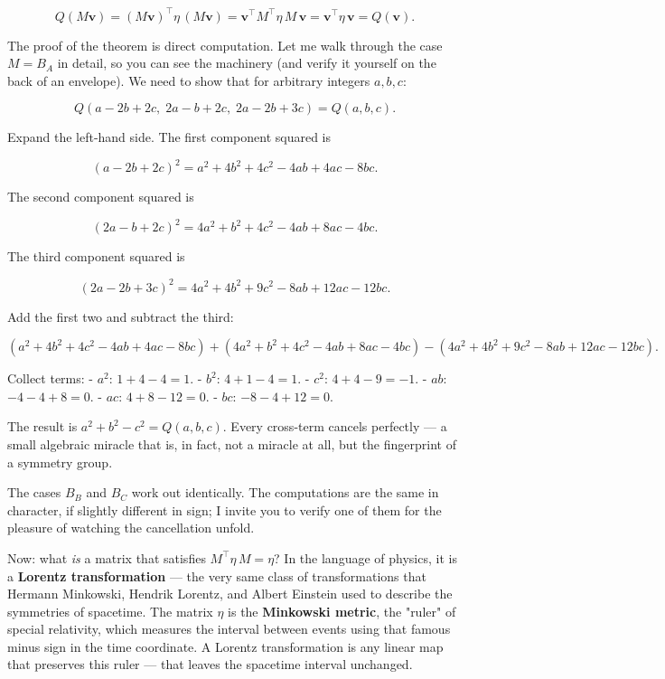 \[Q(M\mathbf{v}) = (M\mathbf{v})^\top \eta\, (M\mathbf{v}) = \mathbf{v}^\top M^\top \eta\, M\, \mathbf{v} = \mathbf{v}^\top \eta\, \mathbf{v} = Q(\mathbf{v}).\]

The proof of the theorem is direct computation. Let me walk through the case $M = B_A$ in detail, so you can see the machinery (and verify it yourself on the back of an envelope). We need to show that for arbitrary integers $a, b, c$:

\[Q(a - 2b + 2c,\; 2a - b + 2c,\; 2a - 2b + 3c) = Q(a, b, c).\]

Expand the left-hand side. The first component squared is

\[(a - 2b + 2c)^2 = a^2 + 4b^2 + 4c^2 - 4ab + 4ac - 8bc.\]

The second component squared is

\[(2a - b + 2c)^2 = 4a^2 + b^2 + 4c^2 - 4ab + 8ac - 4bc.\]

The third component squared is

\[(2a - 2b + 3c)^2 = 4a^2 + 4b^2 + 9c^2 - 8ab + 12ac - 12bc.\]

Add the first two and subtract the third:

\[(a^2 + 4b^2 + 4c^2 - 4ab + 4ac - 8bc) + (4a^2 + b^2 + 4c^2 - 4ab + 8ac - 4bc) - (4a^2 + 4b^2 + 9c^2 - 8ab + 12ac - 12bc).\]

Collect terms:
- $a^2$: $1 + 4 - 4 = 1$.
- $b^2$: $4 + 1 - 4 = 1$.
- $c^2$: $4 + 4 - 9 = -1$.
- $ab$: $-4 - 4 + 8 = 0$.
- $ac$: $4 + 8 - 12 = 0$.
- $bc$: $-8 - 4 + 12 = 0$.

The result is $a^2 + b^2 - c^2 = Q(a, b, c)$. Every cross-term cancels perfectly --- a small algebraic miracle that is, in fact, not a miracle at all, but the fingerprint of a symmetry group.

The cases $B_B$ and $B_C$ work out identically. The computations are the same in character, if slightly different in sign; I invite you to verify one of them for the pleasure of watching the cancellation unfold.

Now: what \textit{is} a matrix that satisfies $M^\top \eta\, M = \eta$? In the language of physics, it is a \textbf{Lorentz transformation} --- the very same class of transformations that Hermann Minkowski, Hendrik Lorentz, and Albert Einstein used to describe the symmetries of spacetime. The matrix $\eta$ is the \textbf{Minkowski metric}, the "ruler" of special relativity, which measures the interval between events using that famous minus sign in the time coordinate. A Lorentz transformation is any linear map that preserves this ruler --- that leaves the spacetime interval unchanged.

